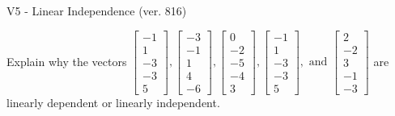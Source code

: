 \begin{exercise}
  \begin{exerciseTitle}V5 - Linear Independence (ver. 816)\end{exerciseTitle}
  \begin{exerciseStatement}
    Explain why the vectors \(\left[\begin{array}{r}
-1 \\
1 \\
-3 \\
-3 \\
5
\end{array}\right] , \left[\begin{array}{r}
-3 \\
-1 \\
1 \\
4 \\
-6
\end{array}\right] , \left[\begin{array}{r}
0 \\
-2 \\
-5 \\
-4 \\
3
\end{array}\right] , \left[\begin{array}{r}
-1 \\
1 \\
-3 \\
-3 \\
5
\end{array}\right] , \text{ and } \left[\begin{array}{r}
2 \\
-2 \\
3 \\
-1 \\
-3
\end{array}\right]\) are linearly dependent or linearly independent.	



\end{exerciseStatement}
\end{exercise}
